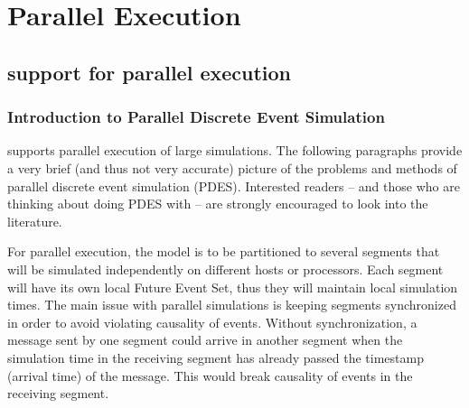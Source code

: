 \chapter{Parallel Execution}
\label{cha:parallel-execution}

\section{{\opp} support for parallel execution}

\subsection{Introduction to Parallel Discrete Event Simulation}

{\opp} supports parallel execution of large
simulations. The following paragraphs provide a very brief (and thus
not very accurate) picture of the problems and methods of parallel
discrete event simulation (PDES). Interested readers --
and those who are thinking about doing PDES with {\opp} -- are
strongly encouraged to look into the literature.


For parallel execution, the model is to be partitioned to several
segments that will be simulated independently on different hosts or
processors. Each segment will have its own local Future Event Set,
thus they will maintain local simulation times. The main issue with
parallel simulations is keeping segments synchronized in order to
avoid violating causality of events. Without synchronization, a
message sent by one segment could arrive in another segment when the
simulation time in the receiving segment has already passed the
timestamp (arrival time) of the message. This would break
causality of events in the receiving segment.

